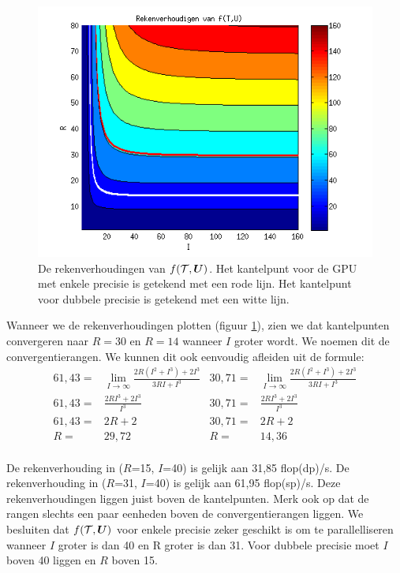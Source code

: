 \begin{figure}
\centering
\includegraphics{haalF}
\caption{\label{haalF}De rekenverhoudingen van $f(\mathcal{T}, \boldsymbol{U})$. Het kantelpunt voor de GPU met enkele precisie is getekend met een rode lijn. Het kantelpunt voor dubbele precisie is getekend met een witte lijn.}
\end{figure}

Wanneer we de rekenverhoudingen plotten (figuur \ref{haalF}), zien we dat kantelpunten convergeren naar $R = 30$ en $R = 14$ wanneer $I$ groter wordt. We noemen dit de convergentierangen. We kunnen dit ook eenvoudig afleiden uit de formule:
\begin{align*}
    61,43 =& \lim_{I \to \infty} \frac{2R (I^2 + I^3) + 2I^3}{3RI + I^3} &
    30,71 =& \lim_{I \to \infty} \frac{2R (I^2 + I^3) + 2I^3}{3RI + I^3}\\
    61,43 =& \frac{2RI^3 + 2I^3}{I^3} &
    30,71 =& \frac{2RI^3 + 2I^3}{I^3}\\
    61,43 =& 2R + 2 &
    30,71 =& 2R + 2\\
    R =& 29,72 &
    R =& 14,36\\
\end{align*}

De rekenverhouding in ($R$=15, $I$=40) is gelijk aan 31,85 flop(dp)/s.
De rekenverhouding in ($R$=31, $I$=40) is gelijk aan 61,95 flop(sp)/s.
Deze rekenverhoudingen liggen juist boven de kantelpunten. Merk ook op dat de rangen slechts een paar eenheden boven de convergentierangen liggen. We besluiten dat $f(\mathcal{T}, \boldsymbol{U})$ voor enkele precisie zeker geschikt is om te parallelliseren wanneer $I$ groter is dan 40 en R groter is dan 31. Voor dubbele precisie moet $I$ boven 40 liggen en $R$ boven 15.

